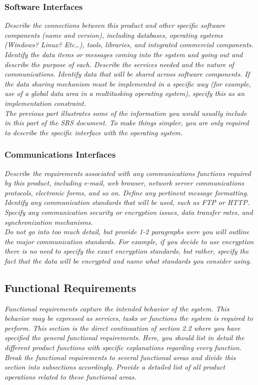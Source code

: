 \documentclass[12pt]{article}
\newcommand{\gnl}{\vspace{1em}\\}      %
\begin{document}
        \subsubsection{Software Interfaces}
            \emph{Describe the connections between this product and other specific software components (name and version), including databases, operating systems (Windows? Linux? Etc\dots), tools, libraries, and integrated commercial components. Identify the data items or messages coming into the system and going out and describe the purpose of each. Describe the services needed and the nature of communications. Identify data that will be shared across software components. If the data sharing mechanism must be implemented in a specific way (for example, use of a global data area in a multitasking operating system), specify this as an implementation constraint.\gnl The previous part illustrates some of the information you would usually include in this part of the SRS document. To make things simpler, you are only required to describe the specific interface with the operating system.}
        \subsubsection{Communications Interfaces}
            \emph{Describe the requirements associated with any communications functions required by this product, including e-mail, web browser, network server communications protocols, electronic forms, and so on. Define any pertinent message formatting. Identify any communication standards that will be used, such as FTP or HTTP. Specify any communication security or encryption issues, data transfer rates, and synchronization mechanisms.\gnl Do not go into too much detail, but provide 1-2 paragraphs were you will outline the major communication standards. For example, if you decide to use encryption there is no need to specify the exact encryption standards, but rather, specify the fact that the data will be encrypted and name what standards you consider using.}
    \subsection{Functional Requirements}
        \emph{Functional requirements capture the intended behavior of the system. This behavior may be expressed as services, tasks or functions the system is required to perform. This section is the direct continuation of section 2.2 where you have specified the general functional requirements. Here, you should list in detail the different product functions with specific explanations regarding every function.\gnl Break the functional requirements to several functional areas and divide this section into subsections accordingly. Provide a detailed list of all product operations related to these functional areas.}
\end{document}
